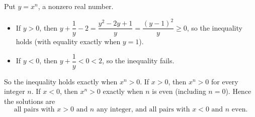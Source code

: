 Put $y=x^n$, a nonzero real number.
\begin{itemize}
\item If $y>0$, then $y+\dfrac1y-2=\dfrac{y^2-2y+1}{y}=\dfrac{(y-1)^2}{y}\ge0$, so the inequality holds (with equality exactly when $y=1$).
\item If $y<0$, then $y+\dfrac1y<0<2$, so the inequality fails.
\end{itemize}
So the inequality holds exactly when $x^n>0$. If $x>0$, then $x^n>0$ for every integer $n$. If $x<0$, then $x^n>0$ exactly when $n$ is even (including $n=0$). Hence the solutions are
\[\boxed{\text{all pairs with } x>0 \text{ and } n \text{ any integer, and all pairs with } x<0 \text{ and } n \text{ even}}.\]
